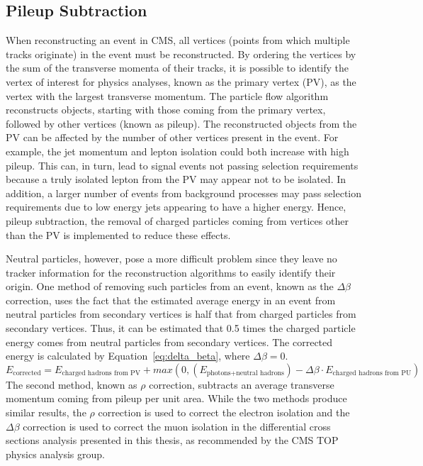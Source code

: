 \subsection{Pileup Subtraction}
\label{ss:pileup_subtraction}
When reconstructing an event in CMS, all vertices (points from which multiple tracks originate) in the event
must be reconstructed. By ordering the vertices by the sum of the transverse momenta of their tracks, it is
possible to identify the vertex of interest for physics analyses, known as the primary vertex (PV), as the
vertex with the largest transverse momentum. The particle flow algorithm reconstructs objects, starting with
those coming from the primary vertex, followed by other vertices (known as pileup). The reconstructed objects
from the PV can be affected by the number of other vertices present in the event. For example, the jet
momentum and lepton isolation could both increase with high pileup. This can, in turn, lead to signal events
not passing selection requirements because a truly isolated lepton from the PV may appear not to be isolated.
In addition, a larger number of events from background processes may pass selection requirements due to low
energy jets appearing to have a higher energy. Hence, pileup subtraction, the removal of charged particles
coming from vertices other than the PV is implemented to reduce these effects.

Neutral particles, however, pose a more difficult problem since they leave no tracker information for the
reconstruction algorithms to easily identify their origin. One method of removing such particles from an
event, known as the $\Delta\beta$ correction, uses the fact that the estimated average energy in an event from
neutral particles from secondary vertices is half that from charged particles from secondary vertices. Thus,
it can be estimated that 0.5 times the charged particle energy comes from neutral particles from secondary
vertices. The corrected energy is calculated by Equation~\ref{eq:delta_beta}, where $\Delta\beta=0$.
\begin{equation}
\label{eq:delta_beta}
E_{\text{corrected}} = E_{\text{charged hadrons from PV}} + max(0, (E_{\text{photons+neutral hadrons}}) -
\Delta\beta \cdot E_{\text{charged hadrons from PU}})
\end{equation}
The second method, known as $\rho$ correction, subtracts an average transverse momentum coming from pileup per
unit area. While the two methods produce similar results, the $\rho$ correction is used to correct the
electron isolation and the $\Delta\beta$ correction is used to correct the muon isolation in the differential
cross sections analysis presented in this thesis, as recommended by the CMS TOP physics analysis group.

